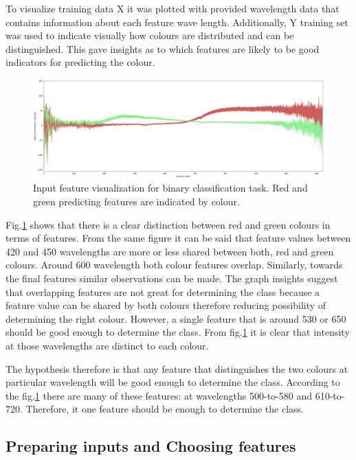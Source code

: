 \documentclass[11pt]{article}
\begin{document}
		To visualize training data X it was plotted with provided wavelength data that contains information about each feature wave length. Additionally, Y training set was used to indicate visually how colours are distributed and can be distinguished. This gave insights as to which features are likely to be good indicators for predicting the colour. 

		\begin{figure}[H]
			\includegraphics[width=1\textwidth]{png/binary_default}
			\caption{Input feature visualization for binary classification task. Red and green predicting features are indicated by colour.}
			\label{fig:binary}
		\end{figure}

		Fig.\ref{fig:binary} shows that there is a clear distinction between red and green colours in terms of features. From the same figure it can be said that feature values between 420 and 450 wavelengths are more or less shared between both, red and green colours. Around 600 wavelength both colour features overlap. Similarly, towards the final features similar observations can be made. The graph insights suggest that overlapping features are not great for determining the class because a feature value can be shared by both colours therefore reducing possibility of determining the right colour. However, a single feature that is around 530 or 650 should be good enough to determine the class. From fig.\ref{fig:binary} it is clear that intensity at those wavelengths are distinct to each colour.

		The hypothesis therefore is that any feature that distinguishes the two colours at particular wavelength will be good enough to determine the class. According to the fig.\ref{fig:binary} there are many of these features: at wavelengths 500-to-580 and 610-to-720. Therefore, it one feature should be enough to determine the class.

	\subsection{Preparing inputs and Choosing features}
\end{document}
